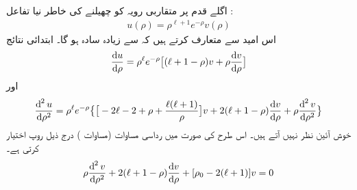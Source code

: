 اگلے قدم پر متقاربی رویہ کو چھیلنے کی خاطر نیا تفاعل :
 \begin{align}\label{مساوات_ابعادی_نئی_علامتیت}
u(\rho)=\rho^{\ell+1}e^{-\rho}v(\rho) 
\end{align}
 اس امید سے متعارف کرتے ہیں کہ  سے  زیادہ سادہ ہو گا۔ ابتدائی نتائج 
\begin{align*}
\frac{\dif u}{\dif \rho}=\rho^{\ell} e^{-\rho} \big[(\ell+1-\rho)v+\rho\frac{\dif v}{\dif \rho}\big]
\end{align*}
اور
\begin{align*}
\frac{\dif^{\,2}u}{\dif \rho^2}=\rho^{\ell}e^{-\rho}\big\{\big[-2\ell-2+\rho+\frac{\ell(\ell+1)}{\rho}\big]v+2(\ell+1-\rho)\frac{\dif v}{\dif \rho}+\rho\frac{\dif^{\,2}v}{\dif \rho^2}\big\}
\end{align*}
خوش آئین نظر نہیں آتے ہیں۔ اس طرح  کی صورت میں رداسی مساوات (مساوات ) درج ذیل روپ اختیار کرتی ہے۔
 \begin{align}\label{مساوات_ابعادی_رداسی_نئی_روپ}
\rho\frac{\dif^{\,2}{v}}{\dif{\rho^{2}}}+2(\ell+1-\rho)\frac{\dif{v}}{\dif{\rho}}+[\rho_{0}-2(\ell+1)]v=0 
\end{align}

